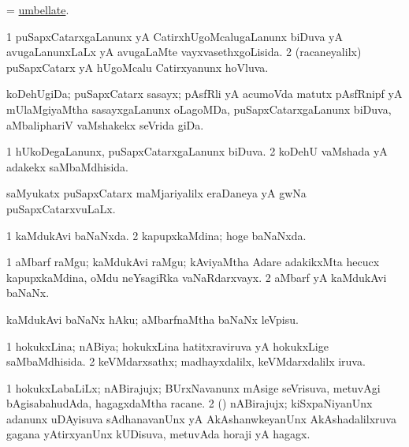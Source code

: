 \bentry
{} 
\gl{\gu}
\expl{}
\bmng
= \hyperlink{umbellate}{umbellate}. 
\emng
\eentry

\bentry
{}
\gl{\gu}
\expl{}
\bmng
\bnum
\num{1} puSapxCatarxgaLanunx yA CatirxhUgoMcalugaLanunx biDuva yA avugaLanunxLaLx yA avugaLaMte vayxvasethxgoLisida. 
\num{2} (racaneyalilx) puSapxCatarx yA hUgoMcalu Catirxyanunx hoVluva. 
\enum
\emng
\eentry

\bentry
{} 
\gl{\gu}
\expl{}
\bmng
koDehUgiDa; puSapxCatarx sasayx; pAsfRli yA acumoVda matutx pAsfRnipf yA mUlaMgiyaMtha sasayxgaLanunx oLagoMDa, puSapxCatarxgaLanunx biDuva, aMbaliphariV vaMshakekx seVrida giDa. 
\emng
\eentry

\bentry
{} 
\gl{\gu}
\expl{}
\bmng
\bnum
\num{1} hUkoDegaLanunx, puSapxCatarxgaLanunx biDuva. 
\num{2} koDehU vaMshada yA adakekx saMbaMdhisida. 
\enum
\emng
\eentry

\bentry
{} 
\gl{\gu}
\expl{}
\bmng
saMyukatx puSapxCatarx maMjariyalilx eraDaneya yA gwNa puSapxCatarxvuLaLx. 
\emng
\eentry

\bentry
{} 
\gl{\gu}
\expl{}
\bmng
\bnum
\num{1} kaMdukAvi baNaNxda. 
\num{2} kapupxkaMdina; hoge baNaNxda. 
\enum
\emng
\eentry

\bentry
{} 
\gl{\nA}
\expl{}
\bmng
\bnum
\num{1} aMbarf raMgu; kaMdukAvi raMgu; kAviyaMtha Adare adakikxMta hecucx kapupxkaMdina, oMdu neYsagiRka vaNaRdarxvayx. 
\num{2} aMbarf yA kaMdukAvi baNaNx. 
\enum
\emng
\eentry

\bentry
{} 
\gl{\sakirx}
\expl{}
\bmng
kaMdukAvi baNaNx hAku; aMbarfnaMtha baNaNx leVpisu. 
\emng
\eentry

\bentry
{} 
\gl{\gu}
\expl{}
\bmng
\bnum
\num{1} hokukxLina; nABiya; hokukxLina hatitxraviruva yA hokukxLige saMbaMdhisida. 
\num{2} keVMdarxsathx; madhayxdalilx, keVMdarxdalilx iruva. 
\enum
\emng
\eentry

\bentry
{}
\gl{\nA}
\expl{}
\bmng
\bnum
\num{1} hokukxLabaLiLx; nABirajujx; BUrxNavanunx mAsige seVrisuva, metuvAgi bAgisabahudAda, hagagxdaMtha racane. 
\num{2} (\vAyA) nABirajujx; kiSxpaNiyanUnx adanunx uDAyisuva sAdhanavanUnx yA AkAshanwkeyanUnx AkAshadalilxruva gagana yAtirxyanUnx kUDisuva, metuvAda horaji yA hagagx. 
\enum
\emng
\eentry

